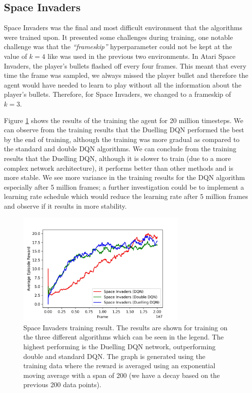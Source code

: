 \subsection{Space Invaders}
Space Invaders was the final and most difficult environment that the algorithms were trained upon. It presented some challenges during training, one notable challenge was that the \textit{``frameskip''} hyperparameter could not be kept at the value of $k = 4$ like was used in the previous two environments. In Atari Space Invaders, the player's bullets flashed off every four frames. This meant that every time the frame was sampled, we always missed the player bullet and therefore the agent would have needed to learn to play without all the information about the player's bullets. Therefore, for Space Invaders, we changed to a frameskip of $k = 3$.

Figure \ref{fig:si-train-results} shows the results of the training the agent for 20 million timesteps. We can observe from the training results that the Duelling DQN performed the best by the end of training, although the training was more gradual as compared to the standard and double DQN algorithms. We can conclude from the training results that the Duelling DQN, although it is slower to train (due to a more complex network architecture), it performs better than other methods and is more stable. We see more variance in the training results for the DQN algorithm especially after 5 million frames; a further investigation could be to implement a learning rate schedule which would reduce the learning rate after 5 million frames and observe if it results in more stability.

\begin{figure}[htbp]
  \centering
  \includegraphics[width=0.75\textwidth]{chapters/chapter5/images/si_plot.jpg}
  \caption[Space Invaders training result plot]{Space Invaders training result. The results are shown for training on the three different algorithms which can be seen in the legend. The highest performing is the Duelling DQN network, outperforming double and standard DQN. The graph is generated using the training data where the reward is averaged using an exponential moving average with a span of 200 (we have a decay based on the previous 200 data points).
    \label{fig:si-train-results}
  }
\end{figure}

